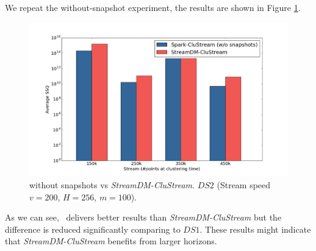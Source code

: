 We repeat the without-snapshot experiment, the results are shown in Figure \ref{fig:comparisonNoSnaps2}.
\begin{figure}[h]
 \centering
 \includegraphics[scale=0.24]{./styles/comparisonNoSnaps2.png}
  \caption{\our without snapshots vs \textit{StreamDM-CluStream}. $DS2$ (Stream speed $v=200$, $H=256$, $m=100$).}
 \label{fig:comparisonNoSnaps2}
\end{figure}
As we can see, \our~delivers better results than \textit{StreamDM-CluStream} but the difference is reduced significantly comparing to $DS1$. These results might indicate that \textit{StreamDM-CluStream}  benefits from larger horizons.